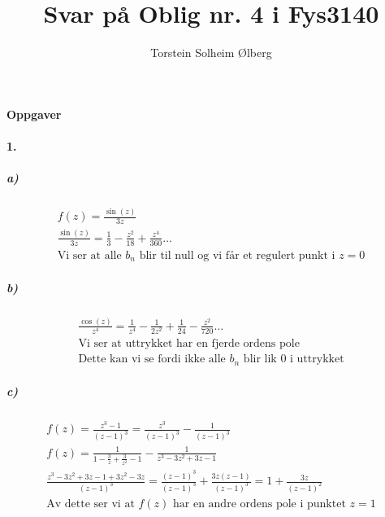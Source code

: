 \documentclass[11pt, A4paper,norsk]{article}
\author{Torstein Solheim Ølberg}
\title{Svar på Oblig nr. 4 i Fys3140}
\begin{document}
\maketitle
	\begin{center}
\Large \textbf{Oppgaver}
	\end{center}









		\paragraph{1.}
			\subparagraph{a)}
				\begin{gather*}
f(z) = \frac{\sin(z)}{3z} \\
\frac{\sin(z)}{3z} = \frac{1}{3} - \frac{z^2}{18} + \frac{z^4}{360} \dots \\
\text{Vi ser at alle $b_n$ blir til null og vi får et regulert punkt i $z = 0$}
				\end{gather*}









			\subparagraph{b)}
				\begin{gather*}
\frac{\cos(z)}{z^4} = \frac{1}{z^4} - \frac{1}{2z^2} + \frac{1}{24} - \frac{z^2}{720} \dots \\
\text{Vi ser at uttrykket har en fjerde ordens pole} \\
\text{Dette kan vi se fordi ikke alle $b_n$ blir lik $0$ i uttrykket}
				\end{gather*}









			\subparagraph{c)}
				\begin{gather*}
f(z) = \frac{z^3 - 1}{(z - 1)^3} = \frac{z^3}{(z - 1)^3} - \frac{1}{(z - 1)^3} \\
f(z) = \frac{1}{1 - \frac{3}{z} + \frac{3}{z^2} - 1} - \frac{1}{z^3 - 3z^2 + 3z - 1} \\
\frac{z^3 - 3z^2 + 3z - 1 + 3z^2 - 3z}{(z - 1)^3} = \frac{(z - 1)^3}{(z - 1)^3} + \frac{3z(z - 1)}{(z - 1)^3} = 1 + \frac{3z}{(z - 1)^2} \\
\text{Av dette ser vi at $f(z)$ har en andre ordens pole i punktet $z = 1$}
				\end{gather*}
			
\end{document}
